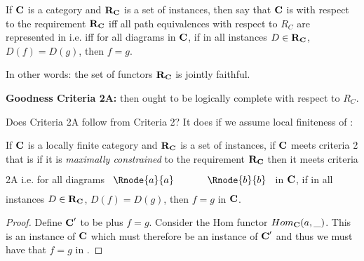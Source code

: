 \documentclass[xcolor=pst,dvips]{beamer}   %
\begin{document}
\begin{frame}
\begin{definition}
If $\textbf{C}$ is a  category and $\textbf{R}_{\textbf{C}}$ is a set of instances,
 then say that  $\textbf{C}$ is  with respect 
to the requirement $\textbf{R}_{\textbf{C}}$ iff all path equivalences with respect to $R_C$ are represented in \catcw 
i.e. iff for all diagrams \fgparalleldiag in $\textbf{C}$,  
if in all instances $D \in \textbf{R}_{\textbf{C}}$, $D(f)=D(g)$,  then $f=g$.
\end{definition}

In other words:
the set of functors $\textbf{R}_{\textbf{C}}$ is jointly faithful.

\textbf{Goodness Criteria 2A:} \IfSforCwithRCwords then \catcw ought to be logically complete
with respect to $R_C$.
\end{frame}

\begin{frame}{Does Criteria 2A follow from Criteria 2?}
It does if we assume local finiteness of \catc:
\begin{lemma}
If $\textbf{C}$ is a locally finite category and $\textbf{R}_{\textbf{C}}$ is a set of instances, if $\textbf{C}$ 
meets criteria 2 that is if it is
\textit{maximally constrained} to the requirement $\textbf{R}_{\textbf{C}}$ then it meets criteria 2A 
i.e. for all diagrams
$
\rule[-0.3cm]{0pt}{0.9cm} %
\begin{array}{c p{0.5cm} c  }
 \Rnode{a}{a}            &&   \Rnode{b}{b}
\end{array} 
$
in $\textbf{C}$,  if in all instances $D \in \textbf{R}_{\textbf{C}}$, $D(f)=D(g)$, 
then $f=g$ in $\textbf{C}$.
\end{lemma}
\begin{proof}
Define $\textbf{C}'$ to be \catc plus $f=g$. Consider the Hom functor $Hom_{\textbf{C}}(a,\_)$. 
This is an instance of $\textbf{C}$ which must therefore be an instance of $\textbf{C}'$ and thus 
we must have that $f=g$ in \catc. 
\end{proof}
\end{frame}
\end{document}
